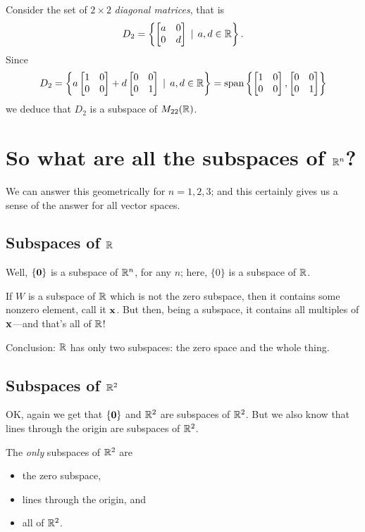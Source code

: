 \begin{myexample} Consider the set of $2\times 2$ \emph{diagonal matrices}, that
is
$$
D_2 = \left\{ \left[ \begin{matrix} a & 0 \\ 0 & d \end{matrix} \right] \,\mid \, a,d\in\mathbb{R} \right\}.
$$
Since
$$
D_2 = \left\{ a\left[ \begin{matrix} 1 & 0 \\ 0 & 0 \end{matrix} \right] +d\left[ \begin{matrix} 0 & 0 \\ 0 & 1 \end{matrix} \right]  \,\mid \, a,d\in\mathbb{R} \right\}= \textrm{span}\left\{\left[ \begin{matrix} 1 & 0 \\ 0 & 0 \end{matrix} \right],\left[ \begin{matrix} 0 & 0 \\ 0 & 1 \end{matrix} \right] \right\}
$$
we deduce that $D_2$ is a subspace of $M_{22}(\mathbb{R})$.
\end{myexample}




\section{So what are all the subspaces of $\mathbb{R}^n$?}

We can answer this geometrically for $n=1,2,3$; and this certainly gives
us a sense of the answer for all vector spaces.

\subsection{Subspaces of $\mathbb{R}$}
Well, $\{ \mathbf{0}\}$ is a subspace of $\mathbb{R}^n$, for any $n$; here,
$\{0\}$ is a subspace of $\mathbb{R}$.

If $W$ is a subspace of $\mathbb{R}$ which is not the zero subspace, then
it contains some nonzero element, call it $\mathbf{x}$.  But then, being
a subspace, it contains all multiples of $\mathbf{x}$---and that's all
of $\mathbb{R}$!

Conclusion:  $\mathbb{R}$ has only two subspaces:  the zero space and the whole thing.


\subsection{Subspaces of $\R^2$}
OK, again we get that $\{ \mathbf{0}\}$ and $\R^2$ are subspaces of $\R^2$.
But we also know that lines through the origin are subspaces of $\R^2$.

\begin{theorem}[Subspaces of $\R^2$]\label{subspacesR^2}
The \emph{only} subspaces of $\R^2$ are
\begin{itemize}
\item the zero subspace,
\item lines through the origin, and
\item all of $\R^2$.
\end{itemize}
\end{theorem}

